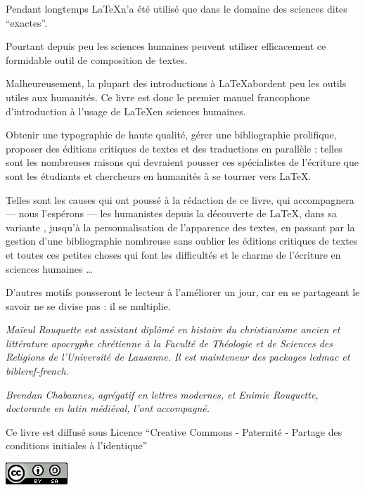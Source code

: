 \thispagestyle{empty}

Pendant longtemps \LaTeX n'a été utilisé que dans le domaine des sciences dites \enquote{exactes}.

Pourtant depuis peu les sciences humaines peuvent utiliser efficacement ce formidable outil de composition de textes.

Malheureusement, la plupart des introductions à \LaTeX abordent peu les outils utiles aux humanités. Ce livre est donc le premier manuel francophone d'introduction à l'usage de \LaTeX en sciences humaines.

Obtenir une typographie de haute qualité, gérer une bibliographie prolifique, proposer des éditions critiques de textes et des traductions en parallèle : telles sont les nombreuses raisons qui devraient pousser ces spécialistes de l'écriture que sont les étudiants et chercheurs en humanités à se tourner vers \LaTeX.

Telles sont les causes qui ont poussé à la rédaction de ce livre, qui accompagnera --- nous l'espérons --- les humanistes depuis la découverte de \LaTeX, dans sa variante \XeLaTeX, jusqu'à la personnalisation de l'apparence des textes, en passant par la gestion d'une bibliographie nombreuse sans oublier les éditions critiques de textes et toutes ces petites choses qui font les difficultés et le charme de l'écriture en sciences humaines \ldots

D'autres motifs pousseront le lecteur à l'améliorer un jour, car en se partageant le savoir ne se divise pas : il se multiplie.

\vspace{4ex}

\scriptsize
\emph{
Maïeul Rouquette est assistant diplômé en histoire du christianisme ancien et littérature apocryphe chrétienne à la Faculté de Théologie et de Sciences des Religions de l'Université de Lausanne.} 
\emph{Il est mainteneur des packages \emph{ledmac} et \emph{bibleref-french}.}


\emph{Brendan Chabannes, agrégatif en lettres modernes, et Enimie Rouquette, doctorante en latin médiéval, l'ont accompagné.}

\normalsize

\vspace{4ex}
Ce livre est diffusé sous Licence \enquote{Creative Commons - Paternité - Partage des conditions initiales à l'identique}

\vspace{2ex}
 \raggedleft\includegraphics[height=3ex]{images/cc.png}
